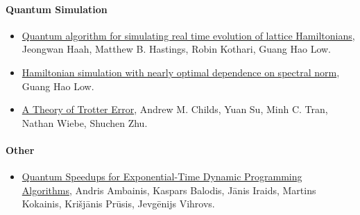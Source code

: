 \documentclass[12pt]{article}
\begin{document}
\paragraph*{Quantum Simulation}
\begin{itemize}
  \item \href{https://arxiv.org/abs/1801.03922}{Quantum algorithm for simulating real time evolution of lattice Hamiltonians}, Jeongwan Haah, Matthew B. Hastings, Robin Kothari, Guang Hao Low.
  \item \href{https://arxiv.org/abs/1807.03967}{Hamiltonian simulation with nearly optimal dependence on spectral norm}, Guang Hao Low. 
  \item \href{https://arxiv.org/abs/1912.08854}{A Theory of Trotter Error}, Andrew M. Childs, Yuan Su, Minh C. Tran, Nathan Wiebe, Shuchen Zhu.
\end{itemize}

\paragraph*{Other}
\begin{itemize}
  \item \href{https://arxiv.org/abs/1807.05209}{Quantum Speedups for Exponential-Time Dynamic Programming Algorithms}, Andris Ambainis, Kaspars Balodis, J\={a}nis Iraids, Martins Kokainis, Kri\v{s}j\={a}nis Pr\={u}sis, Jevg\={e}nijs Vihrovs.
\end{itemize}
\end{document}
